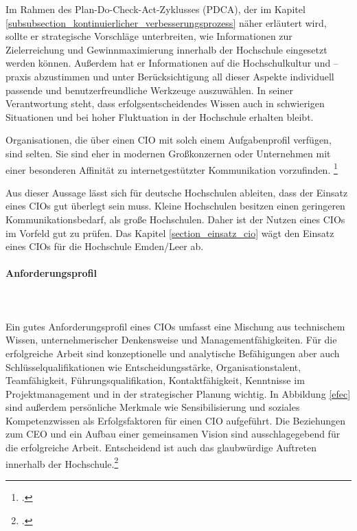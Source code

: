 Im Rahmen des Plan-Do-Check-Act-Zyklusses (PDCA), der im Kapitel  \ref{subsubsection_kontinuierlicher_verbesserungsprozess} näher erläutert wird,  sollte er strategische Vorschläge unterbreiten, wie Informationen zur Zielerreichung und Gewinnmaximierung innerhalb der Hochschule eingesetzt werden können. Außerdem hat er Informationen auf die Hochschulkultur und –praxis  abzustimmen und unter Berücksichtigung all dieser Aspekte individuell passende und benutzerfreundliche Werkzeuge auszuwählen. In seiner Verantwortung steht, dass erfolgsentscheidendes Wissen auch in schwierigen Situationen und bei hoher Fluktuation in der Hochschule erhalten bleibt. 

Organisationen, die über einen CIO mit solch einem Aufgabenprofil verfügen, sind selten. Sie sind eher in modernen Großkonzernen oder Unternehmen mit einer besonderen Affinität zu internetgestützter Kommunikation vorzufinden. \footcite[Vgl.][404]{becker_gora_uhrig_2012}

Aus dieser Aussage lässt sich für deutsche Hochschulen ableiten, dass der Einsatz eines CIOs gut überlegt sein muss. Kleine Hochschulen besitzen einen geringeren Kommunikationsbedarf, als große Hochschulen. Daher ist der Nutzen eines CIOs im Vorfeld gut zu prüfen. Das Kapitel \ref{section_einsatz_cio} wägt den Einsatz eines CIOs für die Hochschule Emden/Leer ab.

\paragraph{Anforderungsprofil}\mbox{}\\\\
\label{anforderungsprofil_informationsmanager}
Ein gutes Anforderungsprofil eines CIOs umfasst eine Mischung aus technischem Wissen, unternehmerischer Denkensweise und Managementfähigkeiten. Für die erfolgreiche Arbeit sind konzeptionelle und analytische Befähigungen aber auch Schlüsselqualifikationen wie Entscheidungsstärke, Organisationstalent, Teamfähigkeit, Führungsqualifikation, Kontaktfähigkeit, Kenntnisse im Projektmanagement und  in der strategischer Planung wichtig. In Abbildung \ref{efec} sind außerdem persönliche Merkmale wie Sensibilisierung und soziales Kompetenzwissen als Erfolgsfaktoren für einen CIO aufgeführt. Die Beziehungen zum CEO und ein Aufbau einer gemeinsamen Vision sind ausschlagegebend für die erfolgreiche Arbeit. Entscheidend ist auch das glaubwürdige Auftreten innerhalb der Hochschule.\footcite[Vgl.][150]{krcmar_einfuhrung_2015}

